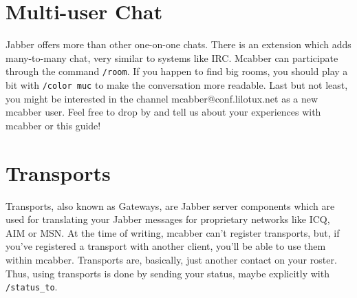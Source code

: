 \documentclass[12pt,oneside,a4]{book}
\begin{document}
\section{Multi-user Chat}
Jabber offers more than other one-on-one chats. There is an extension\cite{xep45} which adds many-to-many chat,
very similar to systems like IRC. Mcabber can participate through the command \verb+/room+. If you happen to
find big rooms, you should play a bit with \verb+/color muc+  to make the conversation more readable.
Last but not least, you might be interested in the channel mcabber@conf.lilotux.net as a new mcabber user.
Feel free to drop by and tell us about your experiences with mcabber or this guide!
\section{Transports}
Transports, also known as Gateways, are Jabber server components which are used for translating your Jabber messages
for proprietary networks like ICQ, AIM or MSN. At the time of writing, mcabber can't register transports, but,
if you've registered a transport with another client, you'll be able to use them within mcabber.
Transports are, basically, just another contact on your roster. Thus, using transports is done by sending your status,
maybe explicitly with \verb+/status_to+.
\end{document}
